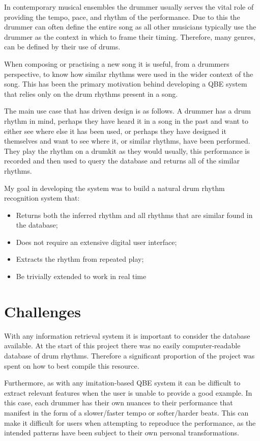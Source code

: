 \documentclass[12pt,twoside,notitlepage]{report}
\begin{document}
	In contemporary musical ensembles the drummer usually serves the vital role of providing the tempo, pace, and rhythm of the performance. Due to this the drummer can often define the entire song as all other musicians typically use the drummer as the context in which to frame their timing. Therefore, many genres, can be defined by their use of drums.
	
	When composing or practising a new song it is useful, from a drummers perspective, to know how similar rhythms were used in the wider context of the song. This has been the primary motivation behind developing a QBE system that relies only on the drum rhythms present in a song. 
	
	The main use case that has driven design is as follows. A drummer has a drum rhythm in mind, perhaps they have heard it in a song in the past and want to either see where else it has been used, or perhaps they have designed it themselves and want to see where it, or similar rhythms, have been performed. They play the rhythm on a drumkit as they would usually, this performance is recorded and then used to query the database and returns all of the similar rhythms.
	
	My goal in developing the system was to build a natural drum rhythm recognition system that:
	\begin{itemize}
		\item{Returns both the inferred rhythm and all rhythms that are similar found in the database;}
		\item{Does not require an extensive digital user interface;}
		\item{Extracts the rhythm from repeated play;}
		\item{Be trivially extended to work in real time}
	\end{itemize}	

	\section{Challenges}
	With any information retrieval system it is important to consider the database available. At the start of this project there was no easily computer-readable database of drum rhythms. Therefore a significant proportion of the project was spent on how to best compile this resource.
	
	Furthermore, as with any imitation-based QBE system it can be difficult to extract relevant features when the user is unable to provide a good example. In this case, each drummer has their own nuances to their performance that manifest in the form of a slower/faster tempo or softer/harder beats. This can make it difficult for users when attempting to reproduce the performance, as the intended patterns have been subject to their own personal transformations.
	
\end{document}

